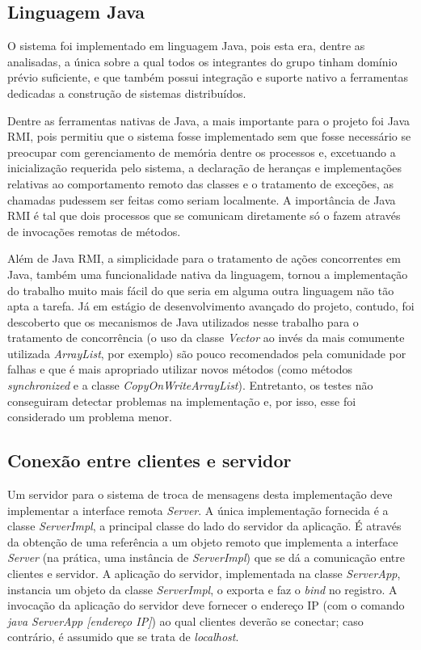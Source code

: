 \documentclass[../main.tex]{subfiles}
\begin{document}
\subsection{Linguagem Java}

O sistema foi implementado em linguagem Java, pois esta era, dentre as analisadas, a única sobre a qual todos os integrantes do grupo tinham domínio prévio suficiente, e que também possui integração e suporte nativo a ferramentas dedicadas a construção de sistemas distribuídos.

Dentre as ferramentas nativas de Java, a mais importante para o projeto foi Java RMI, pois permitiu que o sistema fosse implementado sem que fosse necessário se preocupar com gerenciamento de memória dentre os processos e, excetuando a inicialização requerida pelo sistema, a declaração de heranças e implementações relativas ao comportamento remoto das classes e o tratamento de exceções, as chamadas pudessem ser feitas como seriam localmente.
A importância de Java RMI é tal que dois processos que se comunicam diretamente só o fazem através de invocações remotas de métodos.

Além de Java RMI, a simplicidade para o tratamento de ações concorrentes em Java, também uma funcionalidade nativa da linguagem, tornou a implementação do trabalho muito mais fácil do que seria em alguma outra linguagem não tão apta a tarefa.
Já em estágio de desenvolvimento avançado do projeto, contudo, foi descoberto que os mecanismos de Java utilizados nesse trabalho para o tratamento de concorrência (o uso da classe \textit{Vector} ao invés da mais comumente utilizada \textit{ArrayList}, por exemplo) são pouco recomendados pela comunidade por falhas e que é mais apropriado utilizar novos métodos (como métodos \textit{synchronized} e a classe \textit{CopyOnWriteArrayList}).
Entretanto, os testes não conseguiram detectar problemas na implementação e, por isso, esse foi considerado um problema menor.

\subsection{Conexão entre clientes e servidor}

Um servidor para o sistema de troca de mensagens desta implementação deve implementar a interface remota \textit{Server}.
A única implementação fornecida é a classe \textit{ServerImpl}, a principal classe do lado do servidor da aplicação.
É através da obtenção de uma referência a um objeto remoto que implementa a interface \textit{Server} (na prática, uma instância de \textit{ServerImpl}) que se dá a comunicação entre clientes e servidor.
A aplicação do servidor, implementada na classe \textit{ServerApp}, instancia um objeto da classe \textit{ServerImpl}, o exporta e faz o \textit{bind} no registro.
A invocação da aplicação do servidor deve fornecer o endereço IP (com o comando \textit{java ServerApp [endereço IP]}) ao qual clientes deverão se conectar; caso contrário, é assumido que se trata de \textit{localhost}.
\end{document}
